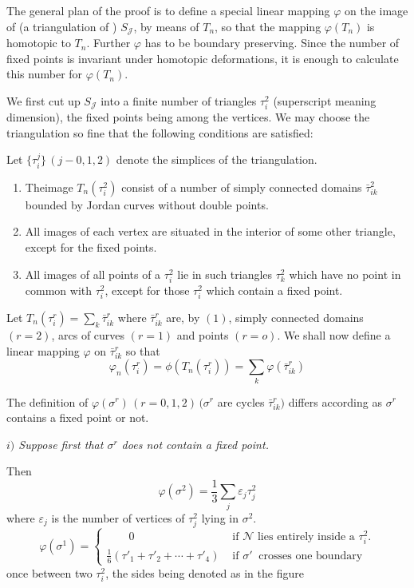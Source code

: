 The general plan of the proof is to define a special linear mapping
$\varphi$ on the image of (a triangulation of ) $S_\mathcal{J}$, by
means of $T_n$, so that the mapping $\varphi(T_n)$ is homotopic to
$T_n$. Further $\varphi$ has to be boundary preserving. Since the
number of fixed points is invariant under homotopic deformations, it
is enough to calculate this number for $\varphi (T_n)$. 

We first cut up $S_\mathcal{J}$ into a finite number of triangles
$\tau^2_i$ (superscript meaning dimension), the fixed points being
among the vertices. We may choose the triangulation so fine that the
following conditions are satisfied: 

Let $\{\tau^j_i\} \,(j - 0, 1, 2)$ denote the simplices of the triangulation.
\begin{enumerate}[1)]
\item The\pageoriginale image $T_n (\tau^2_i)$ consist of a number of simply
  connected domains $\bar{\tau}^2_{ik}$ bounded by Jordan curves
  without double points. 
\item All images of each vertex are situated in the interior of some
  other triangle, except for the fixed points. 
\item All images of all points of a $\tau^2_i$ lie in such triangles
  $\tau^2_k$ which have no point in common with $\tau^2_i$, except for
  those $\tau^2_i$ which contain a fixed point. 
\end{enumerate}

Let $T_n (\tau^r_i) = \sum\limits_k \bar{\tau}^r_{ik}$ where
$\bar{\tau}^r_{ik}$ are, by $(1)$, simply connected domains $(r = 2)$,
arcs of curves $(r = 1)$ and points $(r = o)$. We shall now define a
linear mapping $\varphi $ on $\bar{\tau}^r_{ik}$ so that 
$$
\varphi_n (\tau^r_i) = \phi(T_n (\tau^r_i)) = \sum_k \varphi
(\bar{\tau}^r_{ik}) 
$$

The definition of $\varphi (\sigma^r) \,(r = 0, 1, 2)\,(\sigma^r$ are
cycles $\bar{\tau}^r_{ik})$ differs according as $\sigma^r$ contains a
fixed point or not. 

\noindent \textit {$i)$ Suppose first that $\sigma^r$ does not contain a fixed
  point.} 

Then
$$
\varphi (\sigma^2) = \frac{1}{3} \sum_j \varepsilon_j \tau^2_j
$$
where $\varepsilon_j$ is the number of vertices of $\tau^2_j$ lying in
$\sigma^2$. 
$$
\varphi(\sigma^1) = 
\begin{cases}
  \qquad  0  & \text { if } \mathcal{N} \text { lies entirely inside a
  } \tau^2_i.\\ 
  \frac{1}{6} \left(\tau'_1 + \tau'_2 + \cdots + \tau'_4\right) & \text { if }
  \sigma' ~\text{ crosses one boundary } 
\end{cases}
$$
once between two $\tau^2_i$, the sides being denoted as in the figure 

